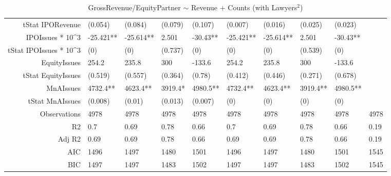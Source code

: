 \begin{table}[ht]
\begin{tabular}{rlllllllll}
  tStat IPORevenue & (0.054) & (0.084) & (0.079) & (0.107) & (0.007) & (0.016) & (0.025) & (0.023) &  \\ 
  IPOIssues * 10^3 & -25.421** & -25.614** & 2.501 & -30.43** & -25.421** & -25.614** & 2.501 & -30.43** &  \\ 
  tStat IPOIssues * 10^3 & (0) & (0) & (0.737) & (0) & (0) & (0) & (0.539) & (0) &  \\ 
  EquityIssues & 254.2 & 235.8 & 300 & -133.6 & 254.2 & 235.8 & 300 & -133.6 &  \\ 
  tStat EquityIssues & (0.519) & (0.557) & (0.364) & (0.78) & (0.412) & (0.446) & (0.271) & (0.678) &  \\ 
  MnAIssues & 4732.4** & 4623.4** & 3919.4* & 4980.5** & 4732.4** & 4623.4** & 3919.4** & 4980.5** &  \\ 
  tStat MnAIssues & (0.008) & (0.01) & (0.013) & (0.007) & (0) & (0) & (0) & (0) &  \\ 
  Observations & 4978 & 4978 & 4978 & 4978 & 4978 & 4978 & 4978 & 4978 & 4978 \\ 
  R2 & 0.7 & 0.69 & 0.78 & 0.66 & 0.7 & 0.69 & 0.78 & 0.66 & 0.19 \\ 
  Adj R2 & 0.69 & 0.69 & 0.78 & 0.66 & 0.69 & 0.69 & 0.78 & 0.66 & 0.19 \\ 
  AIC & 1496 & 1497 & 1480 & 1501 & 1496 & 1497 & 1480 & 1501 & 1545 \\ 
  BIC & 1497 & 1497 & 1483 & 1502 & 1497 & 1497 & 1483 & 1502 & 1545 \\ 
   \hline
\end{tabular}
\caption{GrossRevenue/EquityPartner $\sim$ Revenue + Counts (with Lawyers$^2$)} 
\end{table}
